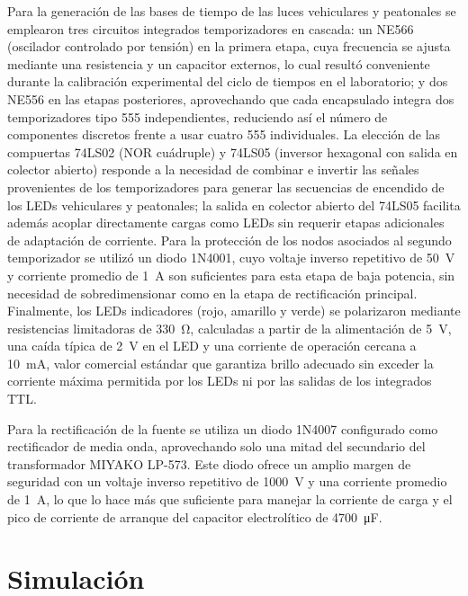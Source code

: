 \documentclass[10pt,onecolumn]{IEEEtran}
\begin{document}
Para la generación de las bases de tiempo de las luces vehiculares y peatonales se emplearon tres circuitos integrados temporizadores en cascada: un NE566 (oscilador controlado por tensión) en la primera etapa, cuya frecuencia se ajusta mediante una resistencia y un capacitor externos, lo cual resultó conveniente durante la calibración experimental del ciclo de tiempos en el laboratorio; y dos NE556 en las etapas posteriores, aprovechando que cada encapsulado integra dos temporizadores tipo 555 independientes, reduciendo así el número de componentes discretos frente a usar cuatro 555 individuales. La elección de las compuertas 74LS02 (NOR cuádruple) y 74LS05 (inversor hexagonal con salida en colector abierto) responde a la necesidad de combinar e invertir las señales provenientes de los temporizadores para generar las secuencias de encendido de los LEDs vehiculares y peatonales; la salida en colector abierto del 74LS05 facilita además acoplar directamente cargas como LEDs sin requerir etapas adicionales de adaptación de corriente. Para la protección de los nodos asociados al segundo temporizador se utilizó un diodo 1N4001, cuyo voltaje inverso repetitivo de \SI{50}{\volt} y corriente promedio de \SI{1}{\ampere} son suficientes para esta etapa de baja potencia, sin necesidad de sobredimensionar como en la etapa de rectificación principal. Finalmente, los LEDs indicadores (rojo, amarillo y verde) se polarizaron mediante resistencias limitadoras de \SI{330}{\ohm}, calculadas a partir de la alimentación de \SI{5}{\volt}, una caída típica de \SI{2}{\volt} en el LED y una corriente de operación cercana a \SI{10}{\milli\ampere}, valor comercial estándar que garantiza brillo adecuado sin exceder la corriente máxima permitida por los LEDs ni por las salidas de los integrados TTL.

Para la rectificación de la fuente se utiliza un diodo 1N4007 configurado como rectificador de media onda, aprovechando solo una mitad del secundario del transformador MIYAKO LP-573. Este diodo ofrece un amplio margen de seguridad con un voltaje inverso repetitivo de \SI{1000}{\volt} y una corriente promedio de \SI{1}{\ampere}, lo que lo hace más que suficiente para manejar la corriente de carga y el pico de corriente de arranque del capacitor electrolítico de \SI{4700}{\micro\farad}.
\\


\section{Simulación}
\end{document}
